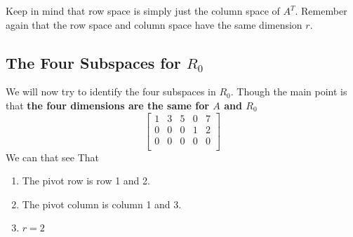 Keep in mind that row space is simply just the column space of \(A^T\). Remember again that the row space and column space have the same dimension \(r\). 

\subsection{The Four Subspaces for \(R_0\)}

We will now try to identify the four subspaces in \(R_0\). 
Though the main point is that \textbf{the four dimensions are the same for \(A\) and \(R_0\)}
\[
    \begin{bmatrix}
        1 & 3 & 5 & 0 & 7  \\
        0 & 0 & 0 & 1 & 2  \\
        0 & 0 & 0 & 0 & 0  \\
    \end{bmatrix}
\]  
We can that see That
\begin{enumerate}
    \item The pivot row is row 1 and 2. 
    \item The pivot column is column 1 and 3. 
    \item \(r = 2\) 
\end{enumerate}

